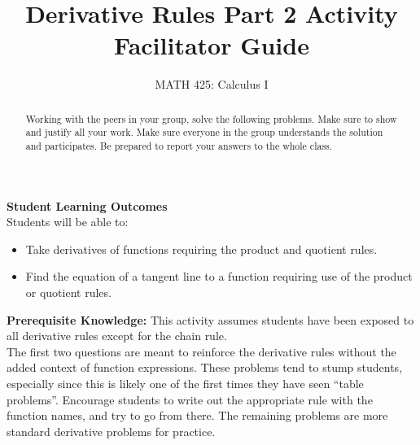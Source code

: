 \documentclass{ximera}
\title{Derivative Rules Part 2 Activity Facilitator Guide}
\author{MATH 425: Calculus I}
\begin{document}
\begin{abstract}
    Working with the peers in your group, solve the following problems. Make sure to show and justify all your work. Make sure everyone in the group understands the solution and participates. Be prepared to report your answers to the whole class. 
\end{abstract}
\maketitle

\textbf{Student Learning Outcomes}\\
Students will be able to:\\
    \begin{itemize} 
        \item Take derivatives of functions requiring the product and quotient rules.
        \item Find the equation of a tangent line to a function requiring use of the product or quotient rules.
    \end{itemize}

\textbf{Prerequisite Knowledge:} This activity assumes students have been exposed to all derivative rules except for the chain rule.\\

The first two questions are meant to reinforce the derivative rules without the added context of function expressions.  These problems tend to stump students, especially since this is likely one of the first times they have seen ``table problems''.  Encourage students to write out the appropriate rule with the function names, and try to go from there.  The remaining problems are more standard derivative problems for practice.
\end{document}
